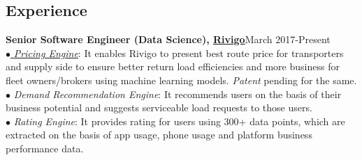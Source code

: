 \documentclass[margin,line]{resume}
\begin{document}
\begin{resume}

    \section{\mysidestyle \bf Experience}
    {\bf Senior Software Engineer (Data Science), \href{https://www.rivigo.com/}{Rivigo}}\label{sec:\mysidestyle\bfexperience}\hfill March 2017-Present\\
      $\bullet$\href{https://eng.rivigo.com/technology/dynamic-prediction-of-trucking-freight-prices-to-digitize-the-indian-trucking-economy/}{ \emph{ Pricing Engine}}:
      It enables Rivigo to present best route price for transporters and supply side to ensure better return load efficiencies and more business for fleet owners/brokers using machine learning models. \emph{Patent} pending for the same.\\
  $\bullet$ \emph{Demand Recommendation Engine}:
  It recommends users on the basis of their business potential and suggests serviceable load requests to those users. \\
    $\bullet$ \emph{Rating Engine}:
    It provides rating for users using 300+ data points, which are extracted on the basis of app usage, phone usage and platform business performance data.


\end{resume}
\end{document}
